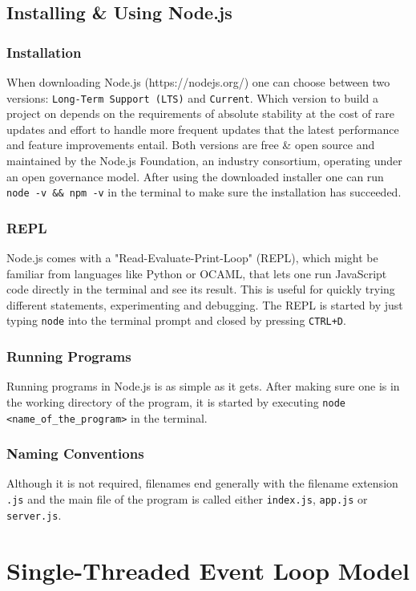 \documentclass{bioinfo}
\begin{document}
\subsection{Installing \& Using Node.js}
\subsubsection{Installation}
When downloading Node.js (https://nodejs.org/) one can choose between two versions: \texttt{Long-Term Support (LTS)} and \texttt{Current}. Which version to build a project on depends on the requirements of absolute stability at the cost of rare updates and effort to handle more frequent updates that the latest performance and feature improvements entail.
Both versions are free \& open source and maintained by the Node.js Foundation, an industry consortium, operating under an open governance model. After using the downloaded installer one can run \texttt{node -v \&\& npm -v} in the terminal to make sure the installation has succeeded.

\subsubsection{REPL}
Node.js comes with a "Read-Evaluate-Print-Loop" (REPL), which might be familiar from languages like Python or OCAML, that lets one run JavaScript code directly in the terminal and see its result. This is useful for quickly trying different statements, experimenting and debugging. The REPL is started by just typing \texttt{node} into the terminal prompt and closed by pressing \texttt{CTRL+D}.

\subsubsection{Running Programs}
Running programs in Node.js is as simple as it gets. After making sure one is in the working directory of the program, it is started by executing \texttt{node <name\_of\_the\_program>} in the terminal.

\subsubsection{Naming Conventions}
Although it is not required, filenames end generally with the filename extension \texttt{.js} and the main file of the program is called either \texttt{index.js}, \texttt{app.js} or \texttt{server.js}.

\section{Single-Threaded Event Loop Model}
\end{document}
